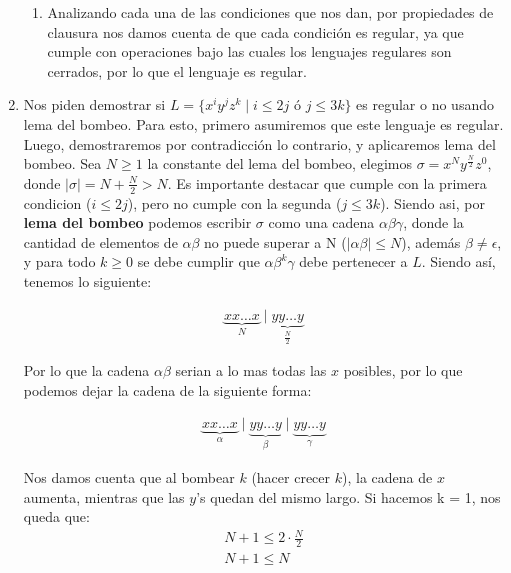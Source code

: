 \documentclass[spanish, fleqn]{article}
\begin{document}
\begin{enumerate}
\begin{enumerate}
            \item Analizando cada una de las condiciones que nos dan, por propiedades de clausura nos damos cuenta de que cada condición es regular, ya que cumple con operaciones bajo las cuales los lenguajes regulares son cerrados, por lo que el lenguaje es regular.
        \end{enumerate}
        
        \item Nos piden demostrar si $L = \{x^i y^j z^k \mid i \leq 2j \text{ ó } j \leq 3k \}$ es regular o no usando lema del bombeo. Para esto, primero asumiremos que este lenguaje es regular. Luego, demostraremos por contradicción lo contrario, y aplicaremos lema del bombeo. 
        Sea $N \geq 1$ la constante del lema del bombeo, elegimos $\sigma = x^N y^\frac{N}{2} z^0$, donde $\mid \sigma \mid = N+\frac{N}{2} > N$. Es importante destacar que cumple con la primera condicion ($i\leq 2j$), pero no cumple con la segunda ($j\leq3k$). Siendo asi, por \textbf{lema del bombeo} podemos escribir $\sigma$ como una cadena $\alpha\beta\gamma$, donde la cantidad de elementos de $\alpha\beta$ no puede superar a N ($\mid\alpha\beta\mid\leq N$), además $\beta\neq\epsilon$, y para todo $k\geq 0$ se debe cumplir que $\alpha\beta^k \gamma$ debe pertenecer a $L$. Siendo así, tenemos lo siguiente:
        
        \begin{align*}
           \underbrace{xx\ldots x}_{N}\mid \underbrace{yy\ldots y}_{\frac{N}{2}}
        \end{align*}
        
        Por lo que la cadena $\alpha\beta$ serian a lo mas todas las $x$ posibles, por lo que podemos dejar la cadena de la siguiente forma:
        
         \begin{align*}
            \underbrace{xx\ldots x}_{\alpha}\mid \underbrace{yy\ldots y}_{\beta} \mid
            \underbrace{yy\ldots y}_{\gamma}
        \end{align*}
        
       Nos damos cuenta que al bombear $k$ (hacer crecer $k$), la cadena de $x$ aumenta, mientras que las $y$'s quedan del mismo largo. Si hacemos k = 1, nos queda que:
       \begin{align*}
            N+1 \leq 2\cdot \frac{N}{2} \\
            N+1 \leq N
       \end{align*}
       

\end{enumerate}
\end{document}
